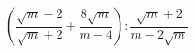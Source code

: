 \begin{ex}[type=expression]
	\begin{condition}
		\( \left( \dfrac{\sqrt{m}-2}{\sqrt{m}+2}+\dfrac{8\sqrt{m}}{m-4} \right):\dfrac{\sqrt{m}+2}{m-2\sqrt{m}} \)
	\end{condition}
\end{ex}